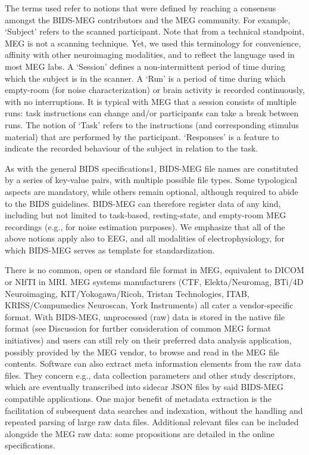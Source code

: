 The terms used refer to notions that were defined by reaching a consensus amongst the BIDS-MEG contributors and the MEG community. For example, ‘Subject’ refers to the scanned participant. Note that from a technical standpoint, MEG is not a scanning technique. Yet, we used this terminology for convenience, affinity with other neuroimaging modalities, and to reflect the language used in most MEG labs. A ‘Session’ defines a non-intermittent period of time during which the subject is in the scanner.  A ‘Run’ is a period of time during which empty-room (for noise characterization) or brain activity is recorded continuously, with no interruptions. It is typical with MEG that a session consists of multiple runs: task instructions can change and/or participants can take a break between runs. The notion of ‘Task’ refers to the instructions (and corresponding stimulus material) that are performed by the participant. ‘Responses’ is a feature to indicate the recorded behaviour of the subject in relation to the task.

As with the general BIDS specifications1, BIDS-MEG file names are constituted by a series of key-value pairs, with multiple possible file types. Some  typological aspects are mandatory, while others remain optional, although required to abide to the BIDS guidelines. BIDS-MEG can therefore register data of any kind, including but not limited to task-based, resting-state, and empty-room MEG recordings (e.g., for noise estimation purposes). We emphasize that all of the above notions apply also to EEG, and all modalities of electrophysiology, for which BIDS-MEG serves as template for standardization.  

There is no common, open or standard file format in MEG, equivalent to DICOM or NIfTI in MRI. MEG systems manufacturers (CTF, Elekta/Neuromag, BTi/4D Neuroimaging, KIT/Yokogawa/Ricoh, Tristan Technologies, ITAB, KRISS/Compumedics Neuroscan, York Instruments) all cater a vendor-specific format. With BIDS-MEG, unprocessed (raw) data is stored in the native file format (see Discussion for further consideration of common MEG format initiatives) and users can still rely on their preferred data analysis application, possibly provided by the MEG vendor, to browse and read in the MEG file contents. Software can also extract meta information elements from the raw data files. They concern e.g., data collection parameters and other study descriptors, which are eventually transcribed into sidecar JSON files by said BIDS-MEG compatible applications. One major benefit of metadata extraction is the facilitation of subsequent data searches and indexation, without the handling and repeated parsing of large raw data files. Additional relevant files can be included alongside the MEG raw data: some propositions are detailed in the online specifications.

